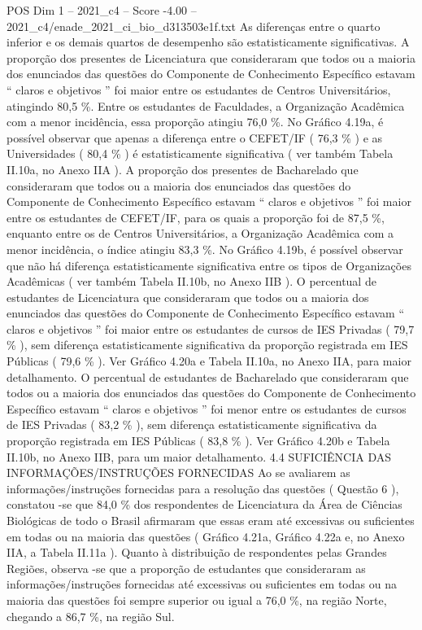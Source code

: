 \begin{textsample}{POS Dim 1 – 2021\_c4 – Score -4.00 – 2021\_c4/enade\_2021\_ci\_bio\_d313503e1f.txt}
As diferenças entre o quarto inferior e os demais quartos de desempenho são estatisticamente significativas.
A proporção dos presentes de Licenciatura que consideraram que todos ou a maioria dos enunciados das questões do Componente de Conhecimento Específico estavam “ claros e objetivos ” foi maior entre os estudantes de Centros Universitários, atingindo 80,5 \%.
Entre os estudantes de Faculdades, a Organização Acadêmica com a menor incidência, essa proporção atingiu 76,0 \%.
No Gráfico 4.19a, é possível observar que apenas a diferença entre o CEFET/IF ( 76,3 \% ) e as Universidades ( 80,4 \% ) é estatisticamente significativa ( ver também Tabela II.10a, no Anexo IIA ).
A proporção dos presentes de Bacharelado que consideraram que todos ou a maioria dos enunciados das questões do Componente de Conhecimento Específico estavam “ claros e objetivos ” foi maior entre os estudantes de CEFET/IF, para os quais a proporção foi de 87,5 \%, enquanto entre os de Centros Universitários, a Organização Acadêmica com a menor incidência, o índice atingiu 83,3 \%.
No Gráfico 4.19b, é possível observar que não há diferença estatisticamente significativa entre os tipos de Organizações Acadêmicas ( ver também Tabela II.10b, no Anexo IIB ).
O percentual de estudantes de Licenciatura que consideraram que todos ou a maioria dos enunciados das questões do Componente de Conhecimento Específico estavam “ claros e objetivos ” foi maior entre os estudantes de cursos de IES Privadas ( 79,7 \% ), sem diferença estatisticamente significativa da proporção registrada em IES Públicas ( 79,6 \% ).
Ver Gráfico 4.20a e Tabela II.10a, no Anexo IIA, para maior detalhamento.
O percentual de estudantes de Bacharelado que consideraram que todos ou a maioria dos enunciados das questões do Componente de Conhecimento Específico estavam “ claros e objetivos ” foi menor entre os estudantes de cursos de IES Privadas ( 83,2 \% ), sem diferença estatisticamente significativa da proporção registrada em IES Públicas ( 83,8 \% ).
Ver Gráfico 4.20b e Tabela II.10b, no Anexo IIB, para um maior detalhamento. 4.4 SUFICIÊNCIA DAS INFORMAÇÕES/INSTRUÇÕES FORNECIDAS Ao se avaliarem as informações/instruções fornecidas para a resolução das questões ( Questão 6 ), constatou -se que 84,0 \% dos respondentes de Licenciatura da Área de Ciências Biológicas de todo o Brasil afirmaram que essas eram até excessivas ou suficientes em todas ou na maioria das questões ( Gráfico 4.21a, Gráfico 4.22a e, no Anexo IIA, a Tabela II.11a ).
Quanto à distribuição de respondentes pelas Grandes Regiões, observa -se que a proporção de estudantes que consideraram as informações/instruções fornecidas até excessivas ou suficientes em todas ou na maioria das questões foi sempre superior ou igual a 76,0 \%, na região Norte, chegando a 86,7 \%, na região Sul.

\end{textsample}
